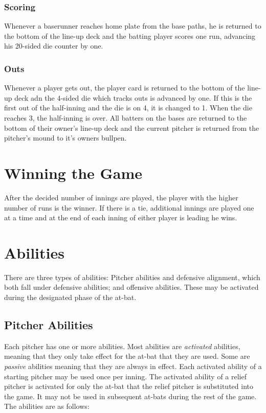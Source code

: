 \documentclass[12pt]{article} %
\begin{document}
\subsubsection{Scoring}
Whenever a baserunner reaches home plate from the base paths, he is returned to the bottom of the line-up deck and the batting player scores one run, advancing his 20-sided die counter by one.

\subsubsection{Outs}
Whenever a player gets out, the player card is returned to the bottom of the line-up deck adn the 4-sided die which tracks outs is advanced by one.  If this is the first out of the half-inning and the die is on 4, it is changed to 1.  When the die reaches 3, the half-inning is over.  All batters on the bases are returned to the bottom of their owner's line-up deck and the current pitcher is returned from the pitcher's mound to it's owners bullpen.

\section{Winning the Game}
After the decided number of innings are played, the player with the higher number of runs is the winner.  If there is a tie, additional innings are played one at a time and at the end of each inning of either player is leading he wins.

\section{Abilities}
There are three types of abilities: Pitcher abilities and defensive alignment, which both fall under defensive abilities; and offensive abilities.  These may be activated during the designated phase of the at-bat.

\subsection{Pitcher Abilities}
Each pitcher has one or more abilities.  Most abilities are \emph{activated} abilities, meaning that they only take effect for the at-bat that they are used.  Some are \emph{passive} abilities meaning that they are always in effect.  Each activated ability of a starting pitcher may be used once per inning.  The activated ability of a relief pitcher is activated for only the at-bat that the relief pitcher is substituted into the game.  It may not be used in subsequent at-bats during the rest of the game.  The abilities are as follows:
\end{document}
